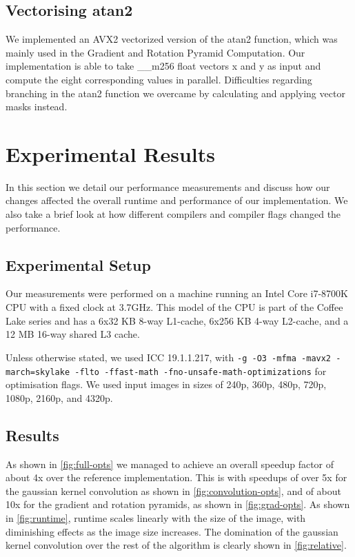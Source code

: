 \documentclass[letterpaper]{article}
\begin{document}
\subsection*{Vectorising atan2}
We implemented an AVX2 vectorized version of the atan2 function, which was mainly used in the Gradient and Rotation Pyramid Computation. Our implementation is able to take \_\_m256 float vectors x and y as input and compute the eight corresponding values in parallel. Difficulties regarding branching in the atan2 function we overcame by calculating and applying vector masks instead.

\section{Experimental Results}\label{sec:results}
In this section we detail our performance measurements and discuss how our changes affected the overall runtime and performance of our implementation. We also take a brief look at how different compilers and compiler flags changed the performance.

\subsection*{Experimental Setup}
Our measurements were performed on a machine running an Intel Core i7-8700K CPU with a fixed clock at 3.7GHz. This model of the CPU is part of the Coffee Lake series and has a 6x32 KB 8-way L1-cache, 6x256 KB 4-way L2-cache, and a 12 MB 16-way shared L3 cache.

Unless otherwise stated, we used ICC 19.1.1.217, with \texttt{-g -O3 -mfma -mavx2 -march=skylake -flto -ffast-math -fno-unsafe-math-optimizations} for optimisation flags. We used input images in sizes of 240p, 360p, 480p, 720p, 1080p, 2160p, and 4320p.

\subsection*{Results}
As shown in \autoref{fig:full-opts} we managed to achieve an overall speedup factor of about 4x over the reference implementation. This is with speedups of over 5x for the gaussian kernel convolution as shown in \autoref{fig:convolution-opts}, and of about 10x for the gradient and rotation pyramids, as shown in \autoref{fig:grad-opts}. As shown in \autoref{fig:runtime}, runtime scales linearly with the size of the image, with diminishing effects as the image size increases. The domination of the gaussian kernel convolution over the rest of the algorithm is clearly shown in \autoref{fig:relative}.
\end{document}

